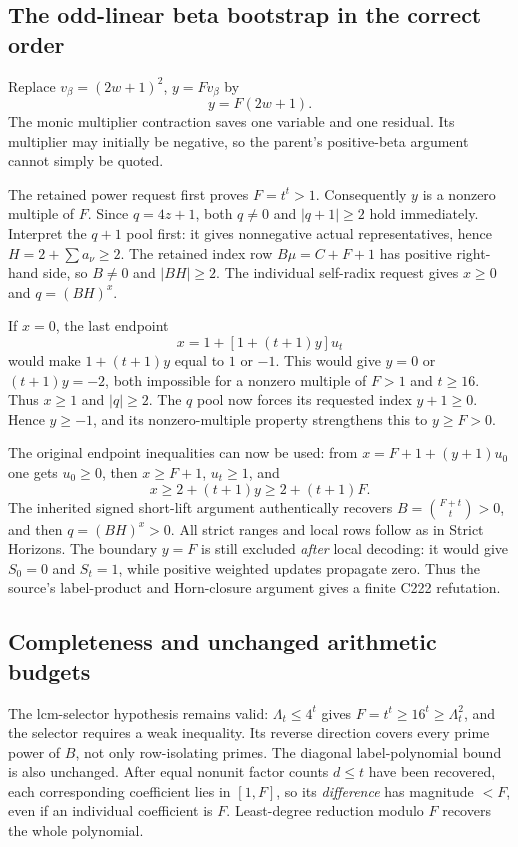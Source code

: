 \subsection{The odd-linear beta bootstrap in the correct order}
Replace $v_\beta=(2w+1)^2$, $y=Fv_\beta$ by
\begin{equation}\label{eq:r21-linear-beta}
 y=F(2w+1).
\end{equation}
The monic multiplier contraction saves one variable and one residual.
Its multiplier may initially be negative, so the parent's positive-beta
argument cannot simply be quoted.

The retained power request first proves $F=t^t>1$. Consequently $y$ is a
nonzero multiple of $F$. Since $q=4z+1$, both $q\ne0$ and $|q+1|\ge2$
hold immediately. Interpret the $q+1$ pool first: it gives nonnegative
actual representatives, hence $H=2+\sum a_\nu\ge2$. The retained index
row $B\mu=C+F+1$ has positive right-hand side, so $B\ne0$ and $|BH|\ge2$.
The individual self-radix request gives $x\ge0$ and $q=(BH)^x$.

If $x=0$, the last endpoint
\[
 x=1+[1+(t+1)y]u_t
\]
would make $1+(t+1)y$ equal to $1$ or $-1$. This would give $y=0$ or
$(t+1)y=-2$, both impossible for a nonzero multiple of $F>1$ and $t\ge16$.
Thus $x\ge1$ and $|q|\ge2$. The $q$ pool now forces its requested index
$y+1\ge0$. Hence $y\ge-1$, and its nonzero-multiple property strengthens
this to $y\ge F>0$.

The original endpoint inequalities can now be used: from
$x=F+1+(y+1)u_0$ one gets $u_0\ge0$, then $x\ge F+1$, $u_t\ge1$, and
\[
 x\ge2+(t+1)y\ge2+(t+1)F.
\]
The inherited signed short-lift argument authentically recovers
$B=\binom{F+t}{t}>0$, and then $q=(BH)^x>0$. All strict ranges and local
rows follow as in Strict Horizons. The boundary $y=F$ is still excluded
\emph{after} local decoding: it would give $S_0=0$ and $S_t=1$, while
positive weighted updates propagate zero. Thus the source's label-product
and Horn-closure argument gives a finite C222 refutation.

\subsection{Completeness and unchanged arithmetic budgets}
The lcm-selector hypothesis remains valid:
$\Lambda_t\le4^t$ gives $F=t^t\ge16^t\ge\Lambda_t^2$, and the selector
requires a weak inequality. Its reverse direction covers every prime power
of $B$, not only row-isolating primes. The diagonal label-polynomial bound
is also unchanged. After equal nonunit factor counts $d\le t$ have been
recovered, each corresponding coefficient lies in $[1,F]$, so its
\emph{difference} has magnitude $<F$, even if an individual coefficient
is $F$. Least-degree reduction modulo $F$ recovers the whole polynomial.

